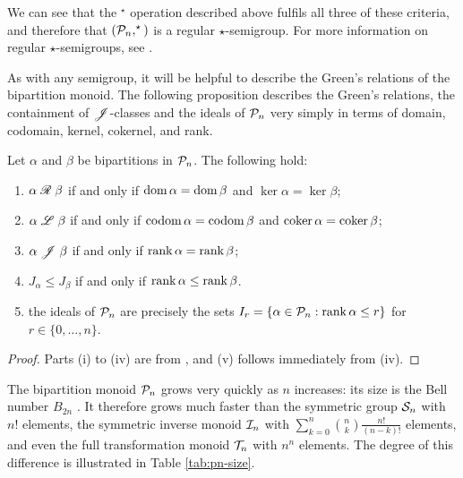 We can see that the $^\star$ operation described above fulfils all three of
these criteria, and therefore that $(\mathcal{P}_n, ^\star)$ is a regular
$\star$-semigroup.  For more information on regular $\star$-semigroups, see
\cite{reg_star_smgp}.

As with any semigroup, it will be helpful to describe the Green's relations of
the bipartition monoid.  The following proposition describes the Green's
relations, the containment of $\mathrel{\mathscr{J}}$-classes and the ideals of $\mathcal{P}_n$ very
simply in terms of domain, codomain, kernel, cokernel, and rank.

\begin{proposition}
  \label{prop:bipartition-greens}
  Let $\alpha$ and $\beta$ be bipartitions in $\mathcal{P}_n$.  The following hold:
  \begin{enumerate}[\rm(i)]
  \item $\alpha \mathrel{\mathscr{R}} \beta$ if and only if $\operatorname{dom} \alpha = \operatorname{dom} \beta$ and
    $\ker \alpha = \ker \beta$;
  \item $\alpha \mathrel{\mathscr{L}} \beta$ if and only if $\operatorname{codom} \alpha = \operatorname{codom} \beta$ and
    $\operatorname{coker} \alpha = \operatorname{coker} \beta$;
  \item $\alpha \mathrel{\mathscr{J}} \beta$ if and only if $\operatorname{rank} \alpha = \operatorname{rank} \beta$;
  \item $J_\alpha \leq J_\beta$ if and only if $\operatorname{rank} \alpha \leq \operatorname{rank} \beta$.
  \item the ideals of $\mathcal{P}_n$ are precisely the sets
    $I_r=\{\alpha \in \mathcal{P}_n : \operatorname{rank} \alpha \leq r\}$ for
    $r \in \{0, \ldots, n\}$.
  \end{enumerate}
  \begin{proof}
    Parts (i) to (iv) are from \cite{fitzgerald_2011}, and (v) follows immediately
    from (iv).
  \end{proof}
\end{proposition}

The bipartition monoid $\mathcal{P}_n$ grows very quickly as $n$ increases: its size is
the Bell number $B_{2n}$ .
It therefore grows much faster than the symmetric group $\mathcal{S}_n$ with $n!$
elements, the symmetric inverse monoid $\mathcal{I}_n$ with
$\sum_{k=0}^n \binom{n}{k} \frac{n!}{(n-k)!}$ elements, and even the full
transformation monoid $\mathcal{T}_n$ with $n^n$ elements.  The degree of this difference
is illustrated in Table \ref{tab:pn-size}.

